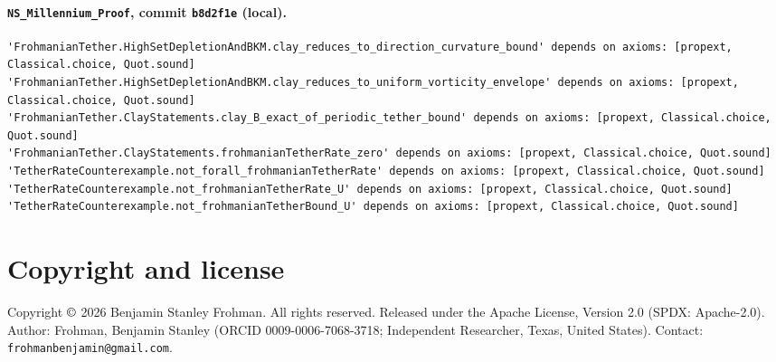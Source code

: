 \documentclass[11pt]{article}
\theoremstyle{plain}
\theoremstyle{definition}
\theoremstyle{remark}
\newcommand{\nssha}{b8d2f1e}
\begin{document}
\paragraph{\texttt{NS\_Millennium\_Proof}, commit \texttt{\nssha} (local).}
\begin{lstlisting}
'FrohmanianTether.HighSetDepletionAndBKM.clay_reduces_to_direction_curvature_bound' depends on axioms: [propext, Classical.choice, Quot.sound]
'FrohmanianTether.HighSetDepletionAndBKM.clay_reduces_to_uniform_vorticity_envelope' depends on axioms: [propext, Classical.choice, Quot.sound]
'FrohmanianTether.ClayStatements.clay_B_exact_of_periodic_tether_bound' depends on axioms: [propext, Classical.choice, Quot.sound]
'FrohmanianTether.ClayStatements.frohmanianTetherRate_zero' depends on axioms: [propext, Classical.choice, Quot.sound]
'TetherRateCounterexample.not_forall_frohmanianTetherRate' depends on axioms: [propext, Classical.choice, Quot.sound]
'TetherRateCounterexample.not_frohmanianTetherRate_U' depends on axioms: [propext, Classical.choice, Quot.sound]
'TetherRateCounterexample.not_frohmanianTetherBound_U' depends on axioms: [propext, Classical.choice, Quot.sound]
\end{lstlisting}

\section*{Copyright and license}

Copyright \(\copyright\) 2026 Benjamin Stanley Frohman. All rights reserved. Released under the Apache License, Version 2.0 (SPDX: Apache-2.0). Author: Frohman, Benjamin Stanley (ORCID 0009-0006-7068-3718; Independent Researcher, Texas, United States). Contact: \texttt{frohmanbenjamin@gmail.com}.
\end{document}
